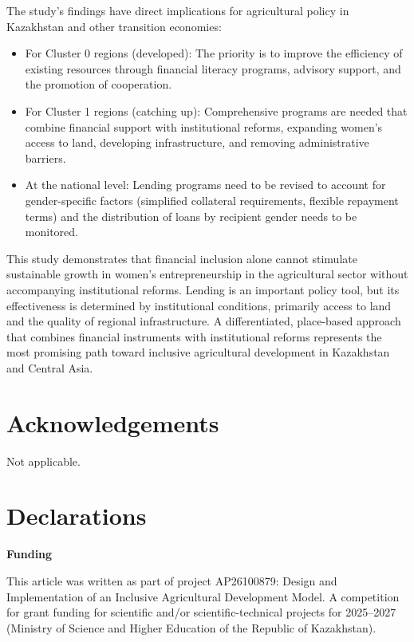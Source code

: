 ﻿\documentclass[pdflatex,sn-mathphys-ay]{sn-jnl}
\begin{document}
The study's findings have direct implications for agricultural policy in
Kazakhstan and other transition economies:

\begin{itemize}
\item For Cluster 0 regions (developed): The priority is to improve the
efficiency of existing resources through financial literacy programs,
advisory support, and the promotion of cooperation.
\item For Cluster 1 regions (catching up): Comprehensive programs are
needed that combine financial support with institutional reforms,
expanding women's access to land, developing infrastructure, and
removing administrative barriers.
\item At the national level: Lending programs need to be revised to
account for gender-specific factors (simplified collateral
requirements, flexible repayment terms) and the distribution of loans by
recipient gender needs to be monitored.
\end{itemize}

This study demonstrates that financial inclusion alone cannot stimulate
sustainable growth in women's entrepreneurship in the agricultural
sector without accompanying institutional reforms. Lending is an
important policy tool, but its effectiveness is determined by
institutional conditions, primarily access to land and the quality of
regional infrastructure. A differentiated, place-based approach that
combines financial instruments with institutional reforms represents the
most promising path toward inclusive agricultural development in
Kazakhstan and Central Asia.

\backmatter

\section*{Acknowledgements}

Not applicable.

\section*{Declarations}

\noindent\textbf{Funding}

This article was written as part of project AP26100879: Design and
Implementation of an Inclusive Agricultural Development Model. A
competition for grant funding for scientific and/or scientific-technical
projects for 2025--2027 (Ministry of Science and Higher Education of the
Republic of Kazakhstan).
\end{document}
